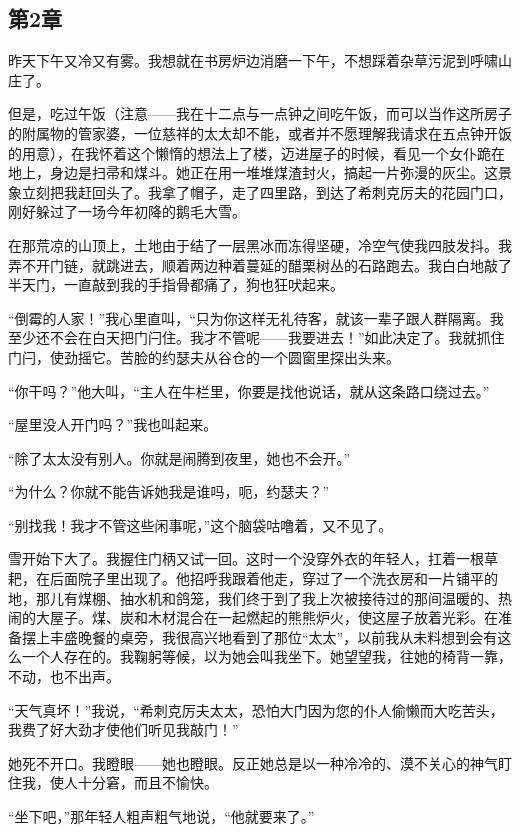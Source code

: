 \subsection{第2章}

\par 昨天下午又冷又有雾。我想就在书房炉边消磨一下午，不想踩着杂草污泥到呼啸山庄了。
\par 但是，吃过午饭（注意——我在十二点与一点钟之间吃午饭，而可以当作这所房子的附属物的管家婆，一位慈祥的太太却不能，或者并不愿理解我请求在五点钟开饭的用意），在我怀着这个懒惰的想法上了楼，迈进屋子的时候，看见一个女仆跪在地上，身边是扫帚和煤斗。她正在用一堆堆煤渣封火，搞起一片弥漫的灰尘。这景象立刻把我赶回头了。我拿了帽子，走了四里路，到达了希刺克厉夫的花园门口，刚好躲过了一场今年初降的鹅毛大雪。
\par 在那荒凉的山顶上，土地由于结了一层黑冰而冻得坚硬，冷空气使我四肢发抖。我弄不开门链，就跳进去，顺着两边种着蔓延的醋栗树丛的石路跑去。我白白地敲了半天门，一直敲到我的手指骨都痛了，狗也狂吠起来。
\par “倒霉的人家！”我心里直叫，“只为你这样无礼待客，就该一辈子跟人群隔离。我至少还不会在白天把门闩住。我才不管呢——我要进去！”如此决定了。我就抓住门闩，使劲摇它。苦脸的约瑟夫从谷仓的一个圆窗里探出头来。
\par “你干吗？”他大叫，“主人在牛栏里，你要是找他说话，就从这条路口绕过去。”
\par “屋里没人开门吗？”我也叫起来。
\par “除了太太没有别人。你就是闹腾到夜里，她也不会开。”
\par “为什么？你就不能告诉她我是谁吗，呃，约瑟夫？”
\par “别找我！我才不管这些闲事呢，”这个脑袋咕噜着，又不见了。
\par 雪开始下大了。我握住门柄又试一回。这时一个没穿外衣的年轻人，扛着一根草耙，在后面院子里出现了。他招呼我跟着他走，穿过了一个洗衣房和一片铺平的地，那儿有煤棚、抽水机和鸽笼，我们终于到了我上次被接待过的那间温暖的、热闹的大屋子。煤、炭和木材混合在一起燃起的熊熊炉火，使这屋子放着光彩。在准备摆上丰盛晚餐的桌旁，我很高兴地看到了那位“太太”，以前我从未料想到会有这么一个人存在的。我鞠躬等候，以为她会叫我坐下。她望望我，往她的椅背一靠，不动，也不出声。
\par “天气真坏！”我说，“希刺克厉夫太太，恐怕大门因为您的仆人偷懒而大吃苦头，我费了好大劲才使他们听见我敲门！”
\par 她死不开口。我瞪眼——她也瞪眼。反正她总是以一种冷冷的、漠不关心的神气盯住我，使人十分窘，而且不愉快。
\par “坐下吧，”那年轻人粗声粗气地说，“他就要来了。”
